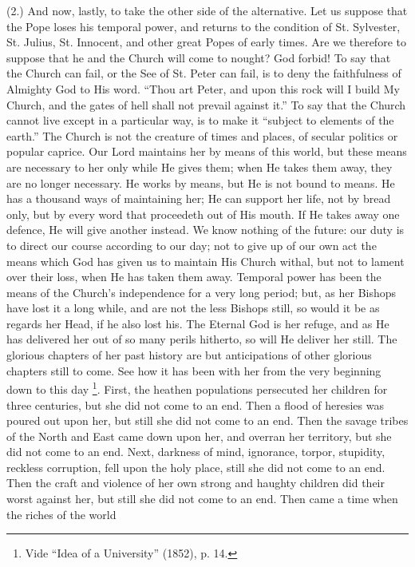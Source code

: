 (2.) And now, lastly, to take the other side of the
alternative. Let us suppose that the Pope loses his
temporal power, and returns to the condition of St.
Sylvester, St. Julius, St. Innocent, and other great
Popes of early times. Are we therefore to suppose that he
and the Church will come to nought? God forbid! To say
that the Church can fail, or the See of St. Peter can
fail, is to deny the faithfulness of Almighty God to His
word. ``Thou art Peter, and upon this rock will I
build My Church, and the gates of hell shall not prevail
against it.'' To say that the Church cannot live
except in a particular way, is to make it ``subject
to elements of the earth.'' The Church is not the
creature of times and places, of secular politics or
popular caprice. Our Lord maintains her by means of this
world, but these means are necessary to her only while He
gives them; when He takes them away, they are no longer
necessary. He works by means, but He is not bound to
means. He has a thousand ways of maintaining her; He can
support her life, not by bread only, but by every word
that proceedeth out of His mouth. If He takes away one
defence, He will give another instead. We know nothing of
the future: our duty is to direct our course according to
our day; not to give up of our own act the means which
God has given us to maintain His Church withal, but not
to lament over their loss, when He has taken them away.
Temporal power has been the means of the Church's
independence for a very long period; but, as her Bishops
have lost it a long while, and are not the less Bishops
still, so would it be as regards her Head, if he also
lost his. The Eternal God is her refuge, and as He has
delivered her out of so many perils hitherto, so will He
deliver her still. The glorious chapters of her past
history are but anticipations of other glorious chapters
still to come. See how it has been with her from the very
beginning down to this day \footnote{Vide ``Idea of a
University'' (1852), p. 14.}. First, the heathen
populations persecuted her children for three centuries,
but she did not come to an end. Then a flood of heresies
was poured out upon her, but still she did not come to an
end. Then the savage tribes of the North and East came
down upon her, and overran her territory, but she did not
come to an end. Next, darkness of mind, ignorance,
torpor, stupidity, reckless corruption, fell upon the
holy place, still she did not come to an end. Then the
craft and violence of her own strong and haughty children
did their worst against her, but still she did not come
to an end. Then came a time when the riches of the world
